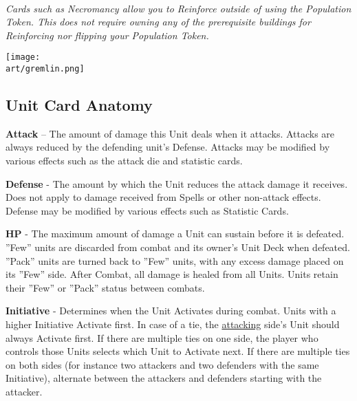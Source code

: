 \begin{multicols*}{2}
\bigskip

\begin{center}
  \\
  \footnotesize\textit{
    Cards such as Necromancy allow you to Reinforce outside of using the Population Token.
    This does not require owning any of the prerequisite buildings for Reinforcing nor flipping your Population Token.
  }
\end{center}

\vfill

\hspace{3.5em}
\texttt{[image: \\art/gremlin.png]}

\clearpage

\end{multicols*}
\begin{multicols}{2}
\subsection*{Unit Card Anatomy}

\vspace{0pt}

\textbf{Attack} – The amount of damage this Unit deals when it attacks.
Attacks are always reduced by the defending unit's Defense.
Attacks may be modified by various effects such as the attack die and statistic cards.\par
\textbf{Defense} - The amount by which the Unit reduces the attack damage it receives.
Does not apply to damage received from Spells or other non-attack effects.
Defense may be modified by various effects such as Statistic Cards.\par
\textbf{\hypertarget{HP}{HP}} - The maximum amount of damage a Unit can sustain before it is defeated.
”Few” units are discarded from combat and its owner's Unit Deck when defeated.
”Pack” units are turned back to ”Few” units, with any excess damage placed on its ”Few” side.
After Combat, all damage is healed from all Units.
Units retain their ”Few” or ”Pack” status between combats.\par
{\hypertarget{Initiative}{\textbf{Initiative}}} - Determines when the Unit Activates during combat.
Units with a higher Initiative Activate first.
In case of a tie, the \hyperlink{Combatterminology}{attacking} side's Unit should always Activate first.
If there are multiple ties on one side, the player who controls those Units selects which Unit to Activate next.
If there are multiple ties on both sides (for instance two attackers and two defenders with the same Initiative), alternate between the attackers and defenders starting with the attacker.\par
\bigskip


\end{multicols}
